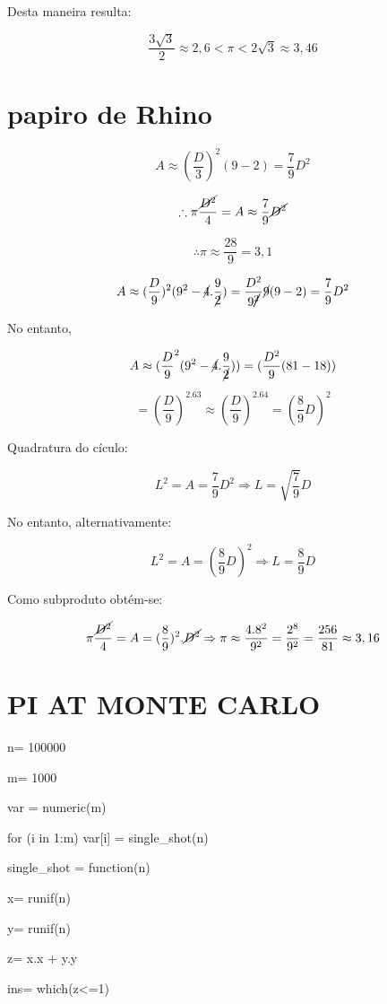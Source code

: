 \documentclass[a4paper, 12pt]{article}
\begin{document}
Desta maneira resulta:

\[
\frac{3\sqrt{3}}{2} \approx 2,6 < \pi < 2\sqrt{3} \approx 3,46
\]
\section{papiro de Rhino}

\[
A \approx (\frac{D}{3})^2 (9-2) = \frac{7}{9}D^2
\]

\[
\therefore \pi \frac{\cancel{D^2}}{4} = A \approx \frac{7}{9} \cancel{D^2}
\]

\[
\therefore \pi \approx \frac{28}{9} = 3,1
\]

\[
A \approx (\frac{D}{9})^2(9^2 - \cancel{4}.\frac{9}{\cancel{2}}) = \frac{D^2}{9\cancel{^2}}\cancel{9}(9-2) = \frac{7}{9}D^2
\]

No entanto, 

\[
A \approx (\frac{D}{9}^2 (9^2-\cancel{4}.\frac{9}{\cancel{2}})) = (\frac{D^2}{9} (81-18))
\]

\[
= (\frac{D}{9})^2.63 \approx (\frac{D}{9})^2.64=(\frac{8}{9}D)^2
\]

Quadratura do cículo:

\[
L^2 = A = \frac{7}{9}D^2 \Rightarrow L = \sqrt{\frac{7}{9}}D
\]

No entanto, alternativamente: 

\[
L^2 = A = (\frac{8}{9}D)^2 \Rightarrow L=\frac{8}{9}D
\]

Como subproduto obtém-se:

\[
\pi \frac{\cancel{D^2}}{4} = A = (\frac{8}{9})^2.\cancel{D^2} \Rightarrow \pi \approx \frac{4.8^2}{9^2} = \frac{2^8}{9^2} = \frac{256}{81} \approx 3,16
\]
\section{PI AT MONTE CARLO}

n= 100000

m= 1000

var = numeric(m)

for (i in 1:m) var[i] = single\_shot(n)

single\_shot = function(n)

x= runif(n)

y= runif(n)

z= x.x + y.y

ins= which(z<=1)
\end{document}

